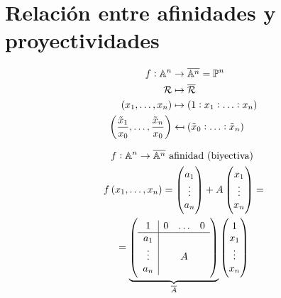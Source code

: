 \section{Relación entre afinidades y proyectividades}
    \begin{minipage}[c]{0,49\textwidth}
        \begin{align*}
                f : \mathbb{A}^n &\to \overline{\mathbb{A}^n}=\mathbb{P}^n \\
                \mathcal{R} &\mapsto \overline{\mathcal{R}} \\
                \left( x_1, \ldots, x_n\right) &\mapsto \left(1:x_1:\ldots:x_n\right)\\
                \left(\frac{\tilde{x}_1}{x_0},\ldots,\frac{\tilde{x}_n}{x_0}\right) &\mapsfrom \left(\tilde{x}_0:\ldots:\tilde{x}_n\right) \\
        \end{align*}
    \end{minipage}
    \vline
    \begin{minipage}[c]{0,49\textwidth}
        \begin{gather*}
            f : \mathbb{A}^n \to \overline{\mathbb{A}^n}  \text{  afinidad (biyectiva) }\\
            f\left( x_1,\ldots,x_n\right) = 
            \begin{pmatrix}
                a_1 \\
                \vdots \\
                a_n \\
            \end{pmatrix}
            +A
            \begin{pmatrix}
                x_1 \\
                \vdots \\
                x_n \\
            \end{pmatrix} = \\ =
            \underbrace{\left(
            \begin{array}{c|ccc}
                1 & 0 & \ldots & 0 \\ \hline
                a_1 & & & \\
                \vdots & & A & \\
                a_n & & & 
            \end{array} \right)}_{\overline{A}}
            \begin{pmatrix}
                1\\
                x_1\\
                \vdots\\
                x_n\\
            \end{pmatrix}
        \end{gather*}
    \end{minipage} \\ \\
